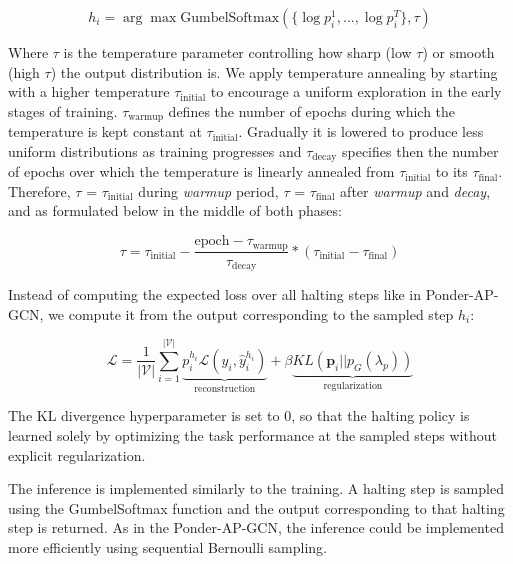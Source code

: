 \documentclass{gdl}
\begin{document}
\begin{equation}
    h_i = \arg\max \text{GumbelSoftmax}(\{\log p_i^1,...,\log p_i^{T}\}, \tau)
\end{equation}

\noindent Where $\tau$ is the temperature parameter controlling how sharp (low $\tau$) or smooth (high $\tau$) the output distribution is. We apply temperature annealing by starting with a higher temperature $\tau_{\text{initial}}$ to encourage a uniform exploration in the early stages of training. $\tau_{\text{warmup}}$ defines the number of epochs during which the temperature is kept constant at $\tau_{\text{initial}}$. Gradually it is lowered to produce less uniform distributions as training progresses and $\tau_{\text{decay}}$ specifies then the number of epochs over which the temperature is linearly annealed from $\tau_{\text{initial}}$ to its $\tau_{\text{final}}$.
Therefore, $\tau$ = $\tau_{\text{initial}}$ during \textit{warmup} period, $\tau$ = $\tau_{\text{final}}$ after \textit{warmup} and \textit{decay}, and as formulated below in the middle of both phases:

\begin{equation}
\tau = \tau_{\text{initial}} - \frac{\text{epoch} - \tau_{\text{warmup}}}{\tau_{\text{decay}}}  * (\tau_{\text{initial}} - \tau_{\text{final}})
\end{equation}

Instead of computing the expected loss over all halting steps like in Ponder-AP-GCN, we compute it from the output corresponding to the sampled step $h_i$:

\begin{equation}
\mathcal{L} = \frac{1}{|\mathcal{V}|} \sum_{i=1}^{\mathcal{|V|}} \underbrace{p_i^{h_i} \mathcal{L}(y_i, \hat{y}_i^{h_i})}_{\text{reconstruction}} + \beta \underbrace{KL(\mathbf{p}_i || p_G(\lambda_p))}_{\text{regularization}}
\end{equation}

\noindent The KL divergence hyperparameter is set to 0, so that the halting policy is learned solely by optimizing the task performance at the sampled steps without explicit regularization. 

The inference is implemented similarly to the training. A halting step is sampled using the GumbelSoftmax function and the output corresponding to that halting step is returned. As in the Ponder-AP-GCN, the inference could be implemented more efficiently using sequential Bernoulli sampling.
\end{document}
